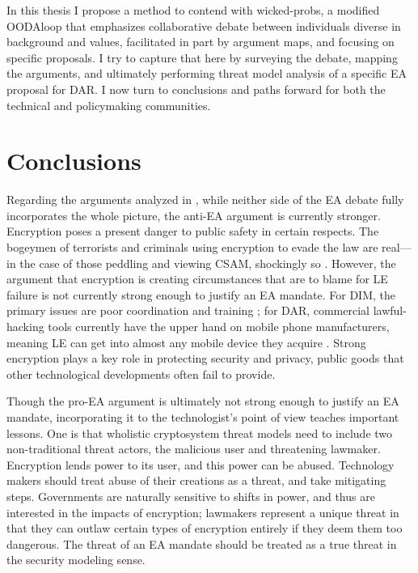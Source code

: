 In this thesis I propose a method to contend with \acp{wicked-prob}, a modified \ac{OODAloop} that emphasizes
collaborative debate between individuals diverse in background and values, facilitated in part by argument maps, and
focusing on specific proposals. I try to capture that here by surveying the debate, mapping the arguments, and
ultimately performing threat model analysis of a specific \ac{EA} proposal for \acl{DAR}. I now turn to conclusions and
paths forward for both the technical and policymaking communities.


\section{Conclusions}


Regarding the arguments analyzed in , while neither side of the \ac{EA} debate fully incorporates
the whole picture, the anti-\ac{EA} argument is currently stronger. Encryption poses a present danger to public safety
in certain respects. The bogeymen of terrorists and criminals using encryption to evade the law are real---in the case
of those peddling and viewing \acl{CSAM}, shockingly so \cite{keller_internet_2019}. However, the argument that
\ac{encryption} is creating circumstances that are to blame for \acl{LE} failure is not currently strong enough to
justify an \ac{EA} mandate. For \ac{DIM}, the primary issues are poor coordination and training \cite{carter_2018}; for
\ac{DAR}, commercial \ac{lawful-hacking} tools currently have the upper hand on mobile phone manufacturers, meaning
\acl{LE} can get into almost any mobile device they acquire \cite{koepke_2020}. Strong \ac{encryption} plays a key role
in protecting security and privacy, public goods that other technological developments often fail to provide.

Though the pro-\ac{EA} argument is ultimately not strong enough to justify an \ac{EA} mandate, incorporating it to the
technologist's point of view teaches important lessons. One is that wholistic cryptosystem threat models need to include
two non-traditional threat actors, the malicious user and threatening lawmaker. Encryption lends power to its user, and
this power can be abused. Technology makers should treat abuse of their creations as a threat, and take mitigating
steps. Governments are naturally sensitive to shifts in power, and thus are interested in the impacts of encryption;
lawmakers represent a unique threat in that they can outlaw certain types of encryption entirely if they deem them too
dangerous. The threat of an \ac{EA} mandate should be treated as a true threat in the security modeling sense.

